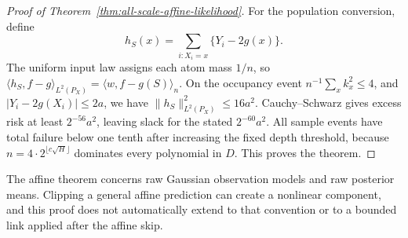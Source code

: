 \begin{proof}[Proof of Theorem~\ref{thm:all-scale-affine-likelihood}]
For the population conversion, define
\[
 h_S(x)=\sum_{i:X_i=x}\{Y_i-2g(x)\}.
\]
The uniform input law assigns each atom mass $1/n$, so $\langle h_S,f-g\rangle_{L^2(P_X)}=\langle w,f-g(S)\rangle_n$. On the occupancy event $n^{-1}\sum_xk_x^2\le4$, and $|Y_i-2g(X_i)|\le2a$, we have $\|h_S\|_{L^2(P_X)}^2\le16a^2$. Cauchy--Schwarz gives excess risk at least $2^{-56}a^2$, leaving slack for the stated $2^{-60}a^2$. All sample events have total failure below one tenth after increasing the fixed depth threshold, because $n=4\cdot2^{\lfloor c\sqrt H\rfloor}$ dominates every polynomial in $D$. This proves the theorem.
\end{proof}

The affine theorem concerns raw Gaussian observation models and raw posterior means. Clipping a general affine prediction can create a nonlinear component, and this proof does not automatically extend to that convention or to a bounded link applied after the affine skip.
